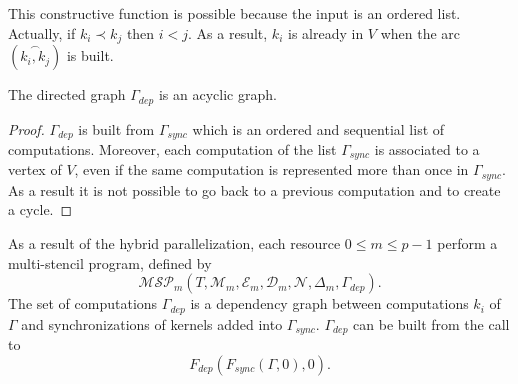 This constructive function is possible because the input is an ordered list. Actually, if $k_i\prec k_j$ then $i<j$. As a result, $k_i$ is already in $V$ when the arc $(\overset{\frown}{k_i,k_j})$ is built. 

\begin{myprop}
The directed graph $\Gamma_{dep}$ is an acyclic graph.
\end{myprop}

\begin{proof}
$\Gamma_{dep}$ is built from $\Gamma_{sync}$ which is an ordered and sequential list of computations. Moreover, each computation of the list $\Gamma_{sync}$ is associated to a vertex of $V$, even if the same computation is represented more than once in $\Gamma_{sync}$. As a result it is not possible to go back to a previous computation and to create a cycle.
\end{proof}

As a result of the hybrid parallelization, each resource $0 \leq m \leq p-1$ perform a multi-stencil program, defined by
\begin{equation*}
\mathcal{MSP}_m(T,\mathcal{M}_m,\mathcal{E}_m,\mathcal{D}_m,\mathcal{N},\Delta_m,\Gamma_{dep}).
\end{equation*}
The set of computations $\Gamma_{dep}$ is a dependency graph between computations $k_i$ of $\Gamma$ and synchronizations of kernels added into $\Gamma_{sync}$. $\Gamma_{dep}$ can be built from the call to 
\begin{equation*}
F_{dep}(F_{sync}(\Gamma,0),0).
\end{equation*}


